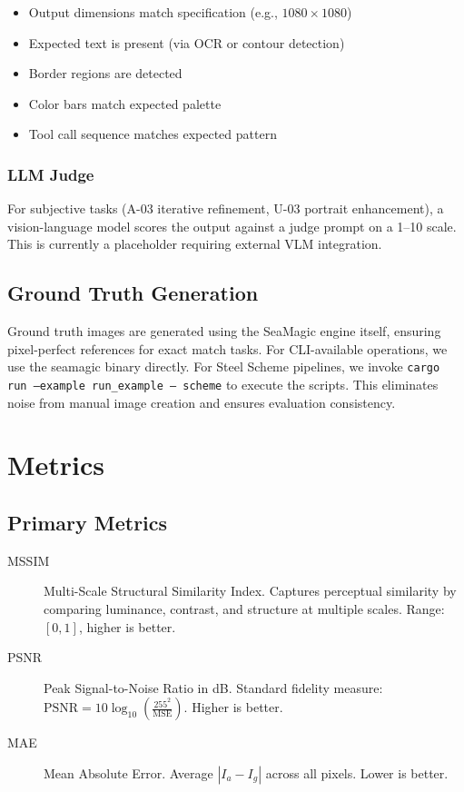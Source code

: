 \documentclass[11pt,a4paper]{article}
\begin{document}
\begin{itemize}
    \item Output dimensions match specification (e.g., $1080 \times 1080$)
    \item Expected text is present (via OCR or contour detection)
    \item Border regions are detected
    \item Color bars match expected palette
    \item Tool call sequence matches expected pattern
\end{itemize}

\subsubsection{LLM Judge}

For subjective tasks (A-03 iterative refinement, U-03 portrait enhancement), a vision-language model scores the output against a judge prompt on a 1--10 scale. This is currently a placeholder requiring external VLM integration.

\subsection{Ground Truth Generation}

Ground truth images are generated using the SeaMagic engine itself, ensuring pixel-perfect references for exact match tasks. For CLI-available operations, we use the seamagic binary directly. For Steel Scheme pipelines, we invoke \texttt{cargo run --example run\_example -- scheme} to execute the scripts. This eliminates noise from manual image creation and ensures evaluation consistency.

\section{Metrics}

\subsection{Primary Metrics}

\begin{description}
    \item[MSSIM] Multi-Scale Structural Similarity Index. Captures perceptual similarity by comparing luminance, contrast, and structure at multiple scales. Range: $[0, 1]$, higher is better.
    \item[PSNR] Peak Signal-to-Noise Ratio in dB. Standard fidelity measure: $\text{PSNR} = 10 \log_{10}(\frac{255^2}{\text{MSE}})$. Higher is better.
    \item[MAE] Mean Absolute Error. Average $|I_a - I_g|$ across all pixels. Lower is better.
\end{description}
\end{document}
